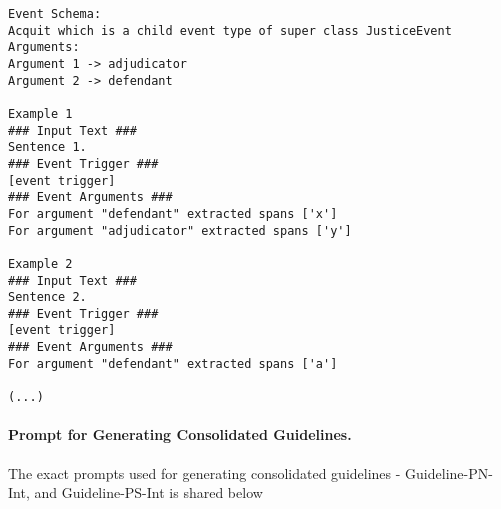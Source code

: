 \begin{lstlisting}[style=customjson, caption={Prompt example for generating Guideline-P, Guideline-PN, and Guideline-PS.}, label={lst:guidelines1}, aboveskip=10pt, belowskip=10pt]
Event Schema:
Acquit which is a child event type of super class JusticeEvent
Arguments:
Argument 1 -> adjudicator
Argument 2 -> defendant

Example 1
### Input Text ###
Sentence 1.
### Event Trigger ###
[event trigger]
### Event Arguments ###
For argument "defendant" extracted spans ['x']
For argument "adjudicator" extracted spans ['y']

Example 2
### Input Text ###
Sentence 2.
### Event Trigger ###
[event trigger]
### Event Arguments ###
For argument "defendant" extracted spans ['a']

(...)
\end{lstlisting}




\paragraph{Prompt for Generating Consolidated Guidelines.}The exact prompts used for generating consolidated guidelines - Guideline-PN-Int, and Guideline-PS-Int is shared below


